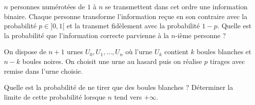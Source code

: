 \documentclass{magnolia}
\begin{document}

$n$ personnes numérotées de $1$ à $n$ se transmettent dans cet ordre une
information binaire.
Chaque personne transforme l'information reçue en son contraire
avec la probabilité $p \in ]0,1[$ et la transmet fidèlement avec la probabilité
$1-p$. Quelle est la probabilité que l'information correcte parvienne à la $n$-ième
personne ?


On dispose de $n+1$ urnes $U_0, U_1, \dots, U_n$ où l'urne $U_k$
contient $k$ boules blanches et $n-k$ boules noires. On choisit une
urne au hasard puis on réalise $p$ tirages avec remise dans l'urne
choisie.
\begin{questions}
\question Quelle est la probabilité de ne tirer que des boules blanches ?
\question Déterminer la limite de cette probabilité lorsque $n$ tend vers $+\infty$.
\end{questions}
\end{document}
